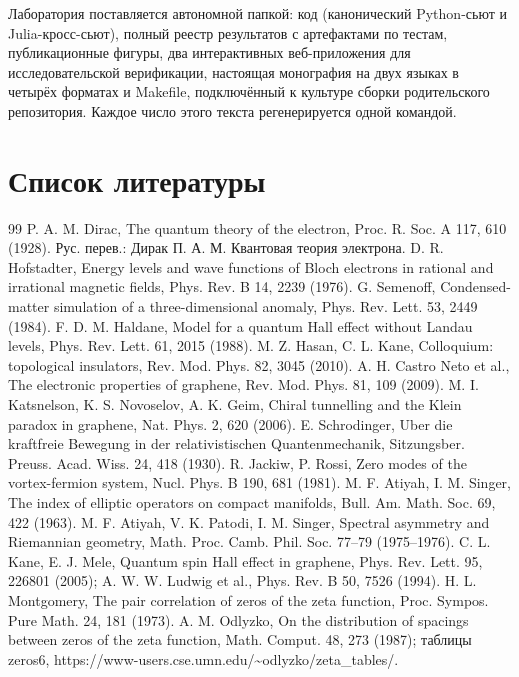 \documentclass[11pt,a4paper]{article}
\begin{document}
Лаборатория поставляется автономной папкой: код (канонический Python-сьют и Julia-кросс-сьют), полный реестр результатов с артефактами по тестам, публикационные фигуры, два интерактивных веб-приложения для исследовательской верификации, настоящая монография на двух языках в четырёх форматах и Makefile, подключённый к культуре сборки родительского репозитория. Каждое число этого текста регенерируется одной командой.

\section*{Список литературы}
\begin{thebibliography}{99}\small
{} P. A. M. Dirac, The quantum theory of the electron, Proc. R. Soc. A 117, 610 (1928). Рус. перев.: Дирак П. А. М. Квантовая теория электрона.
 D. R. Hofstadter, Energy levels and wave functions of Bloch electrons in rational and irrational magnetic fields, Phys. Rev. B 14, 2239 (1976).
 G. Semenoff, Condensed-matter simulation of a three-dimensional anomaly, Phys. Rev. Lett. 53, 2449 (1984).
 F. D. M. Haldane, Model for a quantum Hall effect without Landau levels, Phys. Rev. Lett. 61, 2015 (1988).
 M. Z. Hasan, C. L. Kane, Colloquium: topological insulators, Rev. Mod. Phys. 82, 3045 (2010).
 A. H. Castro Neto et al., The electronic properties of graphene, Rev. Mod. Phys. 81, 109 (2009).
 M. I. Katsnelson, K. S. Novoselov, A. K. Geim, Chiral tunnelling and the Klein paradox in graphene, Nat. Phys. 2, 620 (2006).
 E. Schrodinger, Uber die kraftfreie Bewegung in der relativistischen Quantenmechanik, Sitzungsber. Preuss. Acad. Wiss. 24, 418 (1930).
 R. Jackiw, P. Rossi, Zero modes of the vortex-fermion system, Nucl. Phys. B 190, 681 (1981).
 M. F. Atiyah, I. M. Singer, The index of elliptic operators on compact manifolds, Bull. Am. Math. Soc. 69, 422 (1963).
 M. F. Atiyah, V. K. Patodi, I. M. Singer, Spectral asymmetry and Riemannian geometry, Math. Proc. Camb. Phil. Soc. 77--79 (1975--1976).
 C. L. Kane, E. J. Mele, Quantum spin Hall effect in graphene, Phys. Rev. Lett. 95, 226801 (2005); A. W. W. Ludwig et al., Phys. Rev. B 50, 7526 (1994).
 H. L. Montgomery, The pair correlation of zeros of the zeta function, Proc. Sympos. Pure Math. 24, 181 (1973).
 A. M. Odlyzko, On the distribution of spacings between zeros of the zeta function, Math. Comput. 48, 273 (1987); таблицы zeros6, https://www-users.cse.umn.edu/\textasciitilde{}odlyzko/zeta\_\allowbreak{}tables/.

\end{thebibliography}
\end{document}
